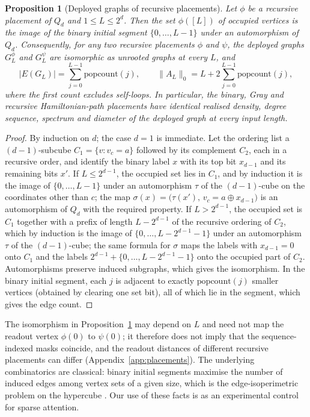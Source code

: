 \documentclass[10pt]{article}
\newtheorem{proposition}{Proposition}
\begin{document}
\begin{proposition}[Deployed graphs of recursive placements]
\label{prop:recursive}
Let $\phi$ be a recursive placement of $Q_d$ and $1\le L\le2^d$. Then the set $\phi([L])$ of occupied vertices is the image of the binary initial segment $\{0,\dots,L-1\}$ under an automorphism of $Q_d$. Consequently, for any two recursive placements $\phi$ and $\psi$, the deployed graphs $G^\phi_L$ and $G^\psi_L$ are isomorphic as unrooted graphs at every $L$, and
\[
|E(G_L)|=\sum_{j=0}^{L-1}\mathrm{popcount}(j),\qquad \lVert A_L\rVert_0=L+2\sum_{j=0}^{L-1}\mathrm{popcount}(j),
\]
where the first count excludes self-loops. In particular, the binary, Gray and recursive Hamiltonian-path placements have identical realised density, degree sequence, spectrum and diameter of the deployed graph at every input length.
\end{proposition}
\begin{proof}
By induction on $d$; the case $d=1$ is immediate. Let the ordering list a $(d-1)$-subcube $C_1=\{v:v_c=a\}$ followed by its complement $C_2$, each in a recursive order, and identify the binary label $x$ with its top bit $x_{d-1}$ and its remaining bits $x'$. If $L\le2^{d-1}$, the occupied set lies in $C_1$, and by induction it is the image of $\{0,\dots,L-1\}$ under an automorphism $\tau$ of the $(d-1)$-cube on the coordinates other than $c$; the map $\sigma(x)=\big(\tau(x'),\,v_c=a\oplus x_{d-1}\big)$ is an automorphism of $Q_d$ with the required property. If $L>2^{d-1}$, the occupied set is $C_1$ together with a prefix of length $L-2^{d-1}$ of the recursive ordering of $C_2$, which by induction is the image of $\{0,\dots,L-2^{d-1}-1\}$ under an automorphism $\tau$ of the $(d-1)$-cube; the same formula for $\sigma$ maps the labels with $x_{d-1}=0$ onto $C_1$ and the labels $2^{d-1}+\{0,\dots,L-2^{d-1}-1\}$ onto the occupied part of $C_2$. Automorphisms preserve induced subgraphs, which gives the isomorphism. In the binary initial segment, each $j$ is adjacent to exactly $\mathrm{popcount}(j)$ smaller vertices (obtained by clearing one set bit), all of which lie in the segment, which gives the edge count.
\end{proof}

The isomorphism in Proposition~\ref{prop:recursive} may depend on $L$ and need not map the readout vertex $\phi(0)$ to $\psi(0)$; it therefore does not imply that the sequence-indexed masks coincide, and the readout distances of different recursive placements can differ (Appendix~\ref{app:placements}). The underlying combinatorics are classical: binary initial segments maximise the number of induced edges among vertex sets of a given size, which is the edge-isoperimetric problem on the hypercube \citep{harper1964optimal,hart1976note,ellis2016structure}. Our use of these facts is as an experimental control for sparse attention.
\end{document}
